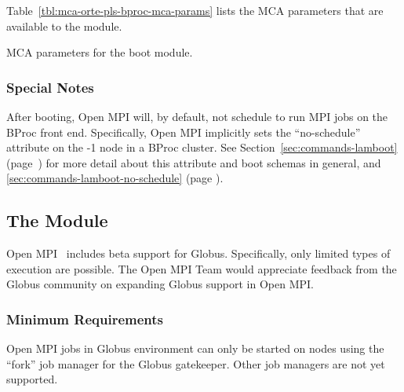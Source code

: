 Table~\ref{tbl:mca-orte-pls-bproc-mca-params} lists the MCA parameters
that are available to the  module.

\begin{table}[htbp]
  \begin{ssiparamtb}
%
  \end{ssiparamtb}
  \caption{MCA parameters for the  boot module.}
  \label{tbl:mca-orte-pls-bproc-mca-params}
\end{table}


\subsubsection{Special Notes}

After booting, Open MPI will, by default, not schedule to run MPI jobs on
the BProc front end.  Specifically, Open MPI implicitly sets the
``no-schedule'' attribute on the -1 node in a BProc cluster.  See
Section~\ref{sec:commands-lamboot}
(page~\pageref{sec:commands-lamboot}) for more detail about this
attribute and boot schemas in general, and
\ref{sec:commands-lamboot-no-schedule} (page 
\pageref{sec:commands-lamboot-no-schedule}).


\subsection{The  Module}

Open MPI \ompiversion\ includes beta support for Globus.
Specifically, only limited types of execution are possible.  The Open
MPI Team would appreciate feedback from the Globus community on
expanding Globus support in Open MPI.


\subsubsection{Minimum Requirements}

Open MPI jobs in Globus environment can only be started on nodes using
the ``fork'' job manager for the Globus gatekeeper.  Other job
managers are not yet supported.



